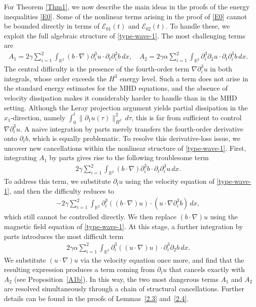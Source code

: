 \documentclass[reqno,11pt]{amsart}
\numberwithin{Thm}{section}
\begin{document}
For Theorem \ref{Thm1}, we now describe the main ideas in the proofs of the energy inequalities \eqref{E0}. Some of the nonlinear terms arising in the proof of \eqref{E0} cannot be bounded
directly in terms of $\mathcal{E}_{01}(t)$ and $\mathcal{E}_{02}(t)$. To handle
these, we exploit the full algebraic structure of \eqref{type-wave-1}. The most
challenging terms are
\begin{align}
	A_1 = 2\gamma\sum_{i=1}^2\int_{\mathbb{R}^2}
	(b\cdot\nabla)\partial_i^3 u\cdot\partial_t\partial_i^3 b\,dx,
	\quad
	A_{2} = 2\gamma\alpha\sum_{i=1}^2\int_{\mathbb{R}^2}
	\partial_i^3\partial_2 u\cdot\partial_t\partial_i^3 b\,dx.\label{def A12}
\end{align}
The central difficulty is the presence of the fourth-order term $\nabla\partial_i^3 u$
in both integrals, whose order exceeds the $H^3$ energy level. Such a term does not
arise in the standard energy estimates for the MHD equations, and the absence of
velocity dissipation makes it considerably harder to handle than in the MHD setting.
Although the Leray projection argument yields partial dissipation in the $x_1$-direction,
namely $\int_0^t\|\partial_1 u(\tau)\|_{H^2}^2\,d\tau$, this is far from sufficient to
control $\nabla\partial_i^3 u$. A naive integration by parts merely transfers the
fourth-order derivative onto $\partial_t b$, which is equally problematic. To resolve
this derivative-loss issue, we uncover new cancellations within the nonlinear structure
of \eqref{type-wave-1}.
First, integrating $A_1$ by parts gives rise to the following troublesome term
\begin{align*}
	2\gamma\sum_{i=1}^2\int_{\mathbb{R}^2}
	(b\cdot\nabla)\partial_i^3 b\cdot\partial_t \partial_i^3u\,dx.
\end{align*}
To address this term, we substitute $\partial_t u$ using the velocity equation of
\eqref{type-wave-1}, and then
 the difficulty reduces to
\begin{align*}
	-2\gamma\sum_{i=1}^2\int_{\mathbb{R}^2}
  \partial_i^3((b\cdot\nabla) u)\cdot (u\cdot\nabla\partial_i^3 b)\,dx,
\end{align*}
which still cannot be controlled directly. We then replace $(b\cdot\nabla)u$ using the
magnetic field equation of \eqref{type-wave-1}.
At this stage, a further integration by parts introduces the most difficult term
\begin{align*}
	2\gamma\alpha\sum_{i=1}^2\int_{\mathbb{R}^2}
	\partial_i^3((u\cdot\nabla) u)\cdot\partial_i^3\partial_2 b\,dx.
\end{align*}
We substitute $(u\cdot\nabla)u$ via the velocity equation once more,
and find that the resulting expression produces a term coming from $\partial_tu$ that cancels exactly with $A_2$
(see Proposition~\ref{A1b}). In this way, the two most dangerous terms $A_1$ and $A_2$
are resolved simultaneously through a chain of structural cancellations. Further details
can be found in the proofs of Lemmas~\ref{2.3} and~\ref{2.4}.
\end{document}
